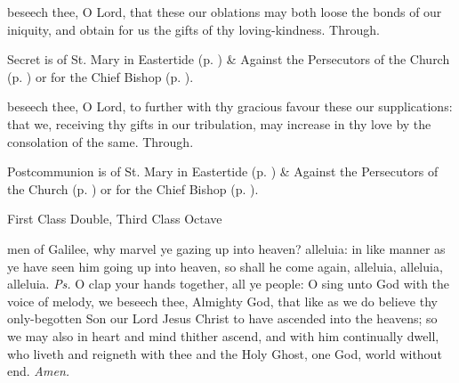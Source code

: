 
\secret
{} beseech thee, O Lord, that these our oblations may both loose the bonds of our iniquity, and obtain for us the gifts of thy loving-kindness. Through.
\begin{rubric}
     Secret is of St. Mary in Eastertide (p. \pageref{SPMaryInEaster}) \&  Against the Persecutors of the Church (p. \pageref{SPAgainst}) or for the Chief Bishop (p. \pageref{SPChiefBishop}).
\end{rubric}

\postcommunion
{} beseech thee, O Lord, to further with thy gracious favour these our supplications: that we, receiving thy gifts in our tribulation, may increase in thy love by the consolation of the same. Through.
\begin{rubric}
     Postcommunion is of St. Mary in Eastertide (p. \pageref{SPMaryInEaster}) \&  Against the Persecutors of the Church (p. \pageref{SPAgainst}) or for the Chief Bishop (p. \pageref{SPChiefBishop}).
\end{rubric}

\begin{inhead}
    {First Class Double, Third Class Octave}
\end{inhead}

\properantiphonfix

\introit
{} men of Galilee, why marvel ye gazing up into heaven? alleluia: in like manner as ye have seen him going up into heaven, so shall he come again, alleluia, alleluia, alleluia. \textit{Ps.} O clap your hands together, all ye people: O sing unto God with the voice of melody,
\collect
{} we beseech thee, Almighty God, that like as we do believe thy only-begotten Son our Lord Jesus Christ to have ascended into the heavens; so we may also in heart and mind thither ascend, and with him continually dwell, who liveth and reigneth with thee and the Holy Ghost, one God, world without end. \textit{Amen.}

